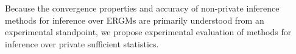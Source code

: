  Because the convergence properties and accuracy of non-private inference methods for inference over ERGMs are primarily understood from an experimental standpoint, we propose experimental evaluation of methods for inference over private sufficient statistics.